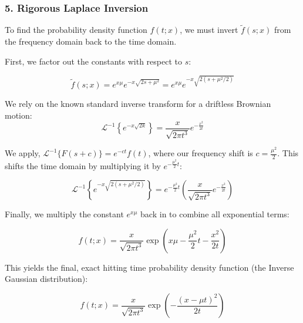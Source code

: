 \documentclass{beamer}
\begin{document}
\begin{frame}
\frametitle{5. Rigorous Laplace Inversion}
To find the probability density function $f(t; x)$, we must invert $\tilde{f}(s; x)$ from the frequency domain back to the time domain.

First, we factor out the constants with respect to $s$:

\[
\tilde{f}(s;x) = e^{x\mu} e^{-x\sqrt{2s+\mu^2}} = e^{x\mu} e^{-x\sqrt{2(s+\mu^2/2)}}
\]

We rely on the known standard inverse transform for a driftless Brownian motion:
\[
\mathcal{L}^{-1} \left\{ e^{-x\sqrt{2k}} \right\} = \frac{x}{\sqrt{2\pi t^3}} e^{-\frac{x^2}{2t}}
\]
\end{frame}
\begin{frame}
We apply, $\mathcal{L}^{-1}\{F(s + c)\} = e^{-ct} f(t)$, where our frequency shift is $c = \frac{\mu^2}{2}$. This shifts the time domain by multiplying it by $e^{-\frac{\mu^2}{2}t}$:

\[
\mathcal{L}^{-1} \left\{ e^{-x\sqrt{2(s+\mu^2/2)}} \right\} = e^{-\frac{\mu^2}{2}t} \left( \frac{x}{\sqrt{2\pi t^3}} e^{-\frac{x^2}{2t}} \right)
\]

Finally, we multiply the constant $e^{x\mu}$ back in to combine all exponential terms:

\[
f(t;x) = \frac{x}{\sqrt{2\pi t^3}} \exp \left( x\mu - \frac{\mu^2}{2}t - \frac{x^2}{2t} \right)
\]
\end{frame}
\begin{frame}
This yields the final, exact hitting time probability density function (the Inverse Gaussian distribution):

\[
f(t;x) = \frac{x}{\sqrt{2\pi t^3}} \exp \left( - \frac{(x - \mu t)^2}{2t} \right)
\]
\end{frame}
\end{document}
